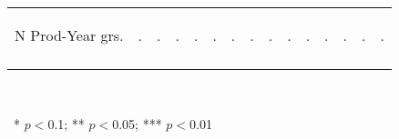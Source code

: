 \begin{center}
\begin{tabular}{lcccccccccccccc}
N Prod-Year grs. & \begin{normalsize}.\end{normalsize} & \begin{normalsize}.\end{normalsize} & \begin{normalsize}.\end{normalsize} & \begin{normalsize}.\end{normalsize} & \begin{normalsize}.\end{normalsize} & \begin{normalsize}.\end{normalsize} & \begin{normalsize}.\end{normalsize} & \begin{normalsize}.\end{normalsize} & \begin{normalsize}.\end{normalsize} & \begin{normalsize}.\end{normalsize} & \begin{normalsize}.\end{normalsize} & \begin{normalsize}.\end{normalsize} & \begin{normalsize}.\end{normalsize} & \begin{normalsize}.\end{normalsize}\\
\noalign{\smallskip}\hline\end{tabular}\\
\smallskip\begin{footnotesize}\ * $p<0$.1; ** $p<0$.05; *** $p<0$.01\end{footnotesize}\\
\smallskip
\end{center}
